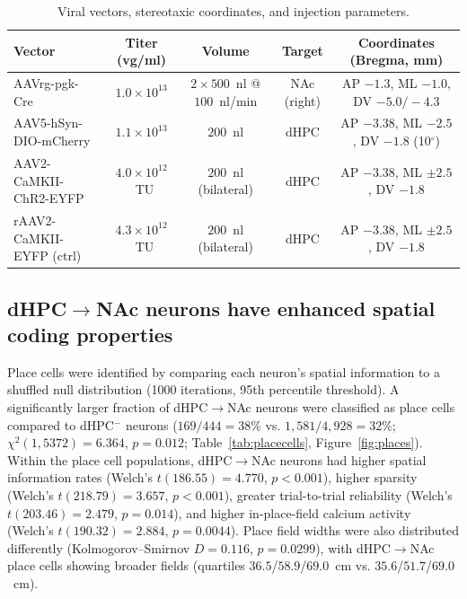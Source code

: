 \documentclass[11pt]{article}
\begin{document}
\begin{table}[H]
\centering
\caption{Viral vectors, stereotaxic coordinates, and injection parameters.}
\label{tab:viral}
\small
\begin{tabular}{lcccc}
\toprule
Vector & Titer (vg/ml) & Volume & Target & Coordinates (Bregma, mm) \\
\midrule
AAVrg-pgk-Cre & $1.0\times10^{13}$ & $2\times500$~nl @ $100$~nl/min & NAc (right) & AP $-1.3$, ML $-1.0$, DV $-5.0/-4.3$ \\
AAV5-hSyn-DIO-mCherry & $1.1\times10^{13}$ & $200$~nl & dHPC & AP $-3.38$, ML $-2.5$, DV $-1.8$ (10$^\circ$) \\
AAV2-CaMKII-ChR2-EYFP & $4.0\times10^{12}$~TU & $200$~nl (bilateral) & dHPC & AP $-3.38$, ML $\pm 2.5$, DV $-1.8$ \\
rAAV2-CaMKII-EYFP (ctrl) & $4.3\times10^{12}$~TU & $200$~nl (bilateral) & dHPC & AP $-3.38$, ML $\pm 2.5$, DV $-1.8$ \\
\bottomrule
\end{tabular}
\end{table}

\subsection{dHPC$\to$NAc neurons have enhanced spatial coding properties}

Place cells were identified by comparing each neuron's spatial information \citep{skaggs1993information,markus1994spatial} to a shuffled null distribution (1000 iterations, 95th percentile threshold). A significantly larger fraction of dHPC$\to$NAc neurons were classified as place cells compared to dHPC$^-$ neurons ($169/444 = 38\%$ vs. $1{,}581/4{,}928 = 32\%$; $\chi^2(1,5372) = 6.364$, $p=0.012$; Table~\ref{tab:placecells}, Figure~\ref{fig:places}). Within the place cell populations, dHPC$\to$NAc neurons had higher spatial information rates (Welch's $t(186.55) = 4.770$, $p<0.001$), higher sparsity (Welch's $t(218.79) = 3.657$, $p<0.001$), greater trial-to-trial reliability (Welch's $t(203.46) = 2.479$, $p=0.014$), and higher in-place-field calcium activity (Welch's $t(190.32) = 2.884$, $p=0.0044$). Place field widths were also distributed differently (Kolmogorov--Smirnov $D=0.116$, $p=0.0299$), with dHPC$\to$NAc place cells showing broader fields (quartiles $36.5$/$58.9$/$69.0$~cm vs. $35.6$/$51.7$/$69.0$~cm).
\end{document}
